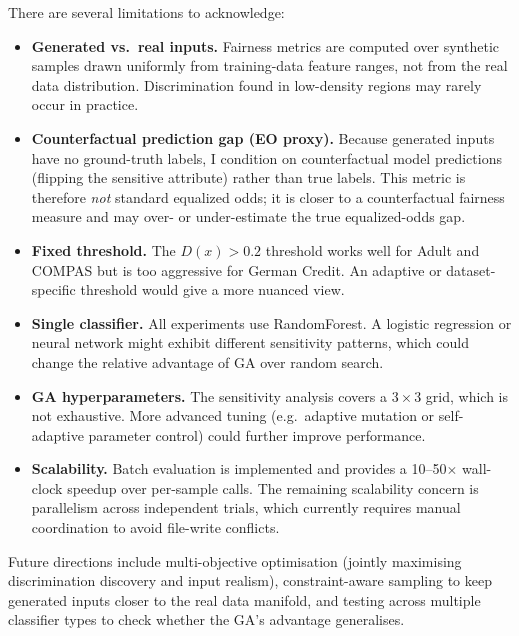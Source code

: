 \documentclass[10pt]{article}
\begin{document}
There are several limitations to acknowledge:
\begin{itemize}
    \item \textbf{Generated vs.\ real inputs.} Fairness metrics are computed over
          synthetic samples drawn uniformly from training-data feature ranges, not from
          the real data distribution.  Discrimination found in low-density regions may
          rarely occur in practice.
    \item \textbf{Counterfactual prediction gap (EO proxy).} Because generated inputs
          have no ground-truth labels, I condition on counterfactual model predictions
          (flipping the sensitive attribute) rather than true labels.  This metric is
          therefore \emph{not} standard equalized odds; it is closer to a counterfactual
          fairness measure and may over- or under-estimate the true equalized-odds gap.
    \item \textbf{Fixed threshold.} The $D(x) > 0.2$ threshold works well for Adult and
          COMPAS but is too aggressive for German Credit.  An adaptive or
          dataset-specific threshold would give a more nuanced view.
    \item \textbf{Single classifier.} All experiments use RandomForest.  A logistic
          regression or neural network might exhibit different sensitivity patterns,
          which could change the relative advantage of GA over random search.
    \item \textbf{GA hyperparameters.} The sensitivity analysis covers a $3{\times}3$
          grid, which is not exhaustive.  More advanced tuning (e.g.\ adaptive mutation
          or self-adaptive parameter control) could further improve performance.
    \item \textbf{Scalability.} Batch evaluation is implemented and provides a
          10--50$\times$ wall-clock speedup over per-sample calls.  The remaining
          scalability concern is parallelism across independent trials, which currently
          requires manual coordination to avoid file-write conflicts.
\end{itemize}

Future directions include multi-objective optimisation (jointly maximising discrimination
discovery and input realism), constraint-aware sampling to keep generated inputs closer
to the real data manifold, and testing across multiple classifier types to check whether
the GA's advantage generalises.

\end{document}
